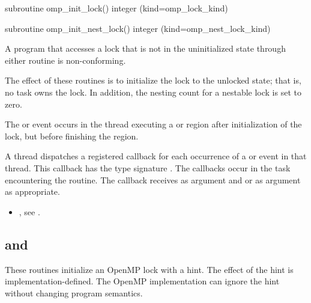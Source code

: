 \begin{fortranspecific}
\begin{boxedcode}
subroutine omp\_init\_lock()
integer (kind=omp\_lock\_kind) 

subroutine omp\_init\_nest\_lock()
integer (kind=omp\_nest\_lock\_kind) 
\end{boxedcode}
\end{fortranspecific}

\constraints
A program that accesses a lock that is not in the uninitialized state through either routine 
is non-conforming.

\effect
The effect of these routines is to initialize the lock to the unlocked state; that is, no task 
owns the lock. In addition, the nesting count for a nestable lock is set to zero.

\events

The  or  event occurs in the thread 
executing a  or  region
after initialization of the lock, but before finishing the region.

\tools

A thread dispatches a registered 
callback for each occurrence of a  or  event 
in that thread.  This callback has the type signature .
The callbacks occur in the task encountering the routine.
The callback receives  as
 argument and
 or 
  as  argument as appropriate.

\crossreferences
\begin{itemize}
\item {}, see
.
\end{itemize}











\subsection[\code{omp\_init\_lock\_with\_hint} and \\\code{omp\_init\_nest\_lock\_with\_hint}]{ and \\}
\label{subsec:omp_init_lock_with_hint and omp_init_nest_lock_with_hint}
\summary
These routines initialize an OpenMP lock with a hint.  
The effect of the hint is implementation-defined. The OpenMP implementation
can ignore the hint without changing program semantics.


